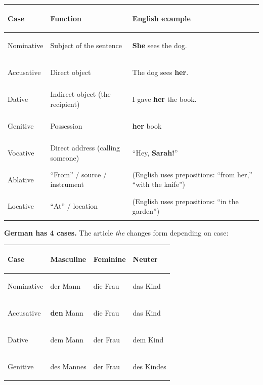 \documentclass[11pt, letterpaper]{article}
\begin{document}
\noindent
{\renewcommand{\arraystretch}{1.5}
\begin{tabularx}{\textwidth}{>{\bfseries\raggedright\arraybackslash}p{3cm}
                              >{\raggedright\arraybackslash}X
                              >{\raggedright\arraybackslash}X}
\toprule
\rowcolor{tableheaderred}
\textbf{Case} & \textbf{Function} & \textbf{English example} \\
\midrule
\rowcolor{rowRe} Nominative & Subject of the sentence            & \textbf{She} sees the dog. \\
\rowcolor{rowA}  Accusative & Direct object                       & The dog sees \textbf{her}. \\
\rowcolor{rowRe} Dative     & Indirect object (the recipient)     & I gave \textbf{her} the book. \\
\rowcolor{rowA}  Genitive   & Possession                          & \textbf{her} book \\
\rowcolor{rowRe} Vocative   & Direct address (calling someone)    & ``Hey, \textbf{Sarah!}'' \\
\rowcolor{rowA}  Ablative   & ``From'' / source / instrument      & (English uses prepositions: ``from her,'' ``with the knife'') \\
\rowcolor{rowRe} Locative   & ``At'' / location                   & (English uses prepositions: ``in the garden'') \\
\bottomrule
\end{tabularx}}

\textbf{German has 4 cases.} The article \emph{the} changes form depending on case:

\noindent
{\renewcommand{\arraystretch}{1.4}
\begin{tabularx}{\textwidth}{>{\bfseries\raggedright\arraybackslash}p{3cm}
                              >{\raggedright\arraybackslash}X
                              >{\raggedright\arraybackslash}X
                              >{\raggedright\arraybackslash}X}
\toprule
\rowcolor{tableheaderred}
\textbf{Case} & \textbf{Masculine} & \textbf{Feminine} & \textbf{Neuter} \\
\midrule
\rowcolor{rowRe} Nominative & der Mann      & die Frau      & das Kind \\
\rowcolor{rowA}  Accusative & \textbf{den} Mann & die Frau   & das Kind \\
\rowcolor{rowRe} Dative     & dem Mann      & der Frau      & dem Kind \\
\rowcolor{rowA}  Genitive   & des Mannes    & der Frau      & des Kindes \\
\bottomrule
\end{tabularx}}
\end{document}
